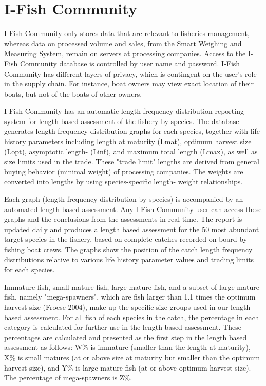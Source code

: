 \clearpage
\newpage

\section{I-Fish Community}

I-Fish Community only stores data that are relevant to fisheries management, whereas data on processed volume and sales, from the Smart Weighing and Measuring System, remain on servers at processing companies. Access to the I-Fish Community database is controlled by user name and password. I-Fish Community has different layers of privacy, which is contingent on the user's role in the supply chain. For instance, boat owners may view exact location of their boats, but not of the boats of other owners.

I-Fish Community has an automatic length-frequency distribution reporting system for length-based assessment of the fishery by species. The database generates length frequency distribution graphs for each species, together with life history parameters including length at maturity (Lmat), optimum harvest size (Lopt), asymptotic length- (Linf), and maximum total length (Lmax), as well as size limits used in the trade. These "trade limit" lengths are derived from general buying behavior (minimal weight) of processing companies. The weights are converted into lengths by using species-specific length- weight relationships.

Each graph (length frequency distribution by species) is accompanied by an automated length-based assessment. Any I-Fish Community user can access these graphs and the conclusions from the assessments in real time. The report is updated daily and produces a length based assessment for the 50 most abundant target species in the fishery, based on complete catches recorded on board by fishing boat crews. The graphs show the position of the catch length frequency distributions relative to various life history parameter values and trading limits for each species.

Immature fish, small mature fish, large mature fish, and a subset of large mature fish, namely "mega-spawners", which are fish larger than 1.1 times the optimum harvest size (Froese 2004), make up the specific size groups used in our length based assessment. For all fish of each species in the catch, the percentage in each category is calculated for further use in the length based assessment. These percentages are calculated and presented as the first step in the length based assessment as follows: W\% is immature (smaller than the length at maturity), X\% is small matures (at or above size at maturity but smaller than the optimum harvest size), and Y\% is large mature fish (at or above optimum harvest size). The percentage of mega-spawners is Z\%.


